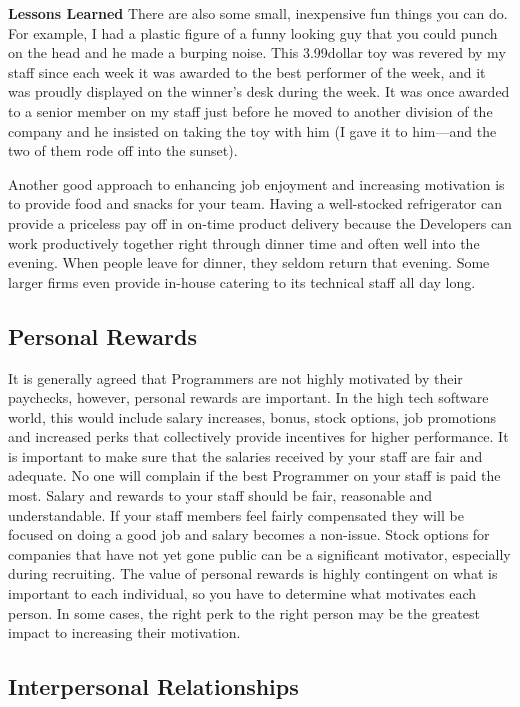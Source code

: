 \documentclass{book}
\begin{document}
\textbf{Lessons Learned} There are also some small,
inexpensive fun things you can do. For example,
I had a plastic figure of a funny looking guy
that you could punch on the head and he made
a burping noise. This 3.99dollar toy was revered by
my staff since each week it was awarded to the
best performer of the week, and it was proudly
displayed on the winner’s desk during the week.
It was once awarded to a senior member on my
staff just before he moved to another division of
the company and he insisted on taking the toy
with him (I gave it to him—and the two of them
rode off into the sunset).

Another good approach to enhancing job enjoyment
and increasing motivation is to provide food and snacks for
your team. Having a well-stocked refrigerator can provide
a priceless pay off in on-time product delivery because the
Developers can work productively together right through
dinner time and often well into the evening. When people
leave for dinner, they seldom return that evening. Some
larger firms even provide in-house catering to its technical
staff all day long.

\subsection{Personal Rewards}

It is generally agreed that Programmers are not highly
motivated by their paychecks, however, personal rewards
are important. In the high tech software world, this would
include salary increases, bonus, stock options, job promotions
and increased perks that collectively provide incentives
for higher performance. It is important to make sure that the
salaries received by your staff are fair and adequate. No one
will complain if the best Programmer on your staff is paid
the most. Salary and rewards to your staff should be fair, reasonable
and understandable. If your staff members feel fairly
compensated they will be focused on doing a good job and
salary becomes a non-issue.
Stock options for companies that have not yet gone public
can be a significant motivator, especially during recruiting.
The value of personal rewards is highly contingent on what is
important to each individual, so you have to determine what
motivates each person. In some cases, the right perk to the
right person may be the greatest impact to increasing their
motivation.

\subsection{Interpersonal Relationships}
\end{document}

